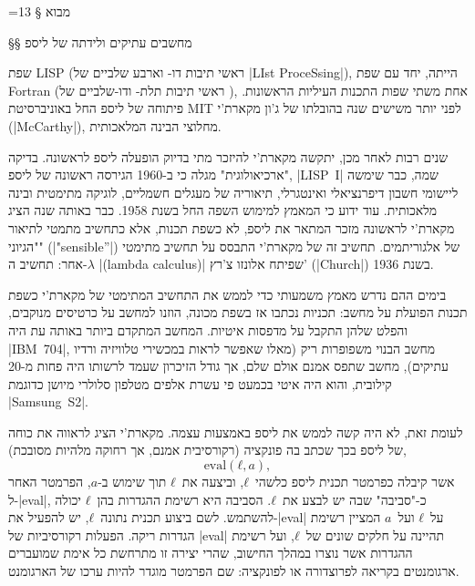 \def\CPL{\E|C|\xspace}

\newcommand{\TopAlign}[1]{\adjustbox{valign=t}{#1}}
{%
    \makeatletter
    =13\relax%
    \gdef\fixNewLine{%
        \def^^M{\space}%
    }%
}
§ מבוא

§§ מחשבים עתיקים ולידתה של ליספ

שפת LISP (ראשי תיבות דו- וארבע שלביים של \E|LIst ProceSsing|), הייתה, יחד עם
שפת Fortran (ראשי תיבות תלת- ודו-שלביים של ), אחת משתי
שפות התכנות העיליות הראשונות. פיתוחה של ליספ החל באוניברסיטת MIT לפני יותר
משישים שנה בהובלתו של ג'ון מקארת'י (\E|McCarthy|), מחלוצי הבינה המלאכותית.

שנים רבות לאחר מכן, יתקשה מקארת'י להיזכר מתי בדיוק הופעלה ליספ לראשונה.
בדיקה "ארכיאולוגית" מגלה כי ב-1960 הגירסה ראשונה של ליספ, \E|LISP~I| שמה, כבר
שימשה ליישומי חשבון דיפרנציאלי ואינטגרלי, תיאוריה של מעגלים חשמליים, לוגיקה
מתימטית ובינה מלאכותית. עוד ידוע כי המאמץ למימוש השפה החל בשנת 1958. כבר באותה
שנה הציג מקארת'י לראשונה מזכר המתאר את ליספ, לא כשפת תכנות, אלא כתחשיב מתמטי
לתיאור "הגיוני" (\E|"sensible”|) של אלגוריתמים. תחשיב זה של מקארת'י התבסס על
תחשיב מתימטי אחר: תחשיב ה-$λ$ \E|(lambda calculus)| שפיתח אלונזו צ'רץ'
(\E|Church|) בשנת 1936.

בימים ההם נדרש מאמץ משמעותי כדי לממש את התחשיב המתימטי של מקארת'י כשפת תכנות
הפועלת על מחשב: תכניות נכתבו אז בשפת מכונה, הוזנו למחשב על כרטיסים מנוקבים,
והפלט שלהן התקבל על מדפסות איטיות. המחשב המתקדם ביותר באותה עת היה \E|IBM~704|,
מחשב הבנוי משפופרות ריק (מאלו שאפשר לראות במכשירי טלוויזיה ורדיו עתיקים), מחשב
שתפס אמנם אולם שלם, אך גודל הזיכרון שעמד לרשותו היה פחות מ-20 קילובית, והוא היה
איטי בכמעט פי עשרת אלפים מטלפון סלולרי מיושן כדוגמת \E|Samsung~S2|.

לעומת זאת, לא היה קשה לממש את ליספ באמצעות עצמה. מקארת'י הציג לראווה את כוחה
של ליספ בכך שכתב בה פונקציה (רקורסיבית אמנם, אך רחוקה מלהיות מסובכת),
\begin{equation} \label{eq:eval}
  \text{eval}(ℓ, a),
\end{equation}
אשר קיבלה כפרמטר תכנית ליספ כלשהי~$ℓ$, וביצעה את~$ℓ$ תוך שימוש ב-$a$, הפרמטר
האחר ל-\E|eval|, כ-"סביבה" שבה יש לבצע את~$ℓ$. הסביבה היא רשימת ההגדרות בהן~$ℓ$
יכולה להשתמש. לשם ביצוע תכנית נתונה~$ℓ$, יש להפעיל את-\E|eval| על~$ℓ$
ועל~$a$ המציין רשימת הגדרות ריקה. הפעלות רקורסיביות של \E|eval| תהיינה על חלקים
שונים של~$ℓ$, ועל רשימת ההגדרות אשר נוצרו במהלך החישוב, שהרי יצירה זו מתרחשת כל
אימת שמועברים ארגומנטים בקריאה לפרוצדורה או לפונקציה: שם הפרמטר מוגדר להיות
ערכו של הארגומנט.

